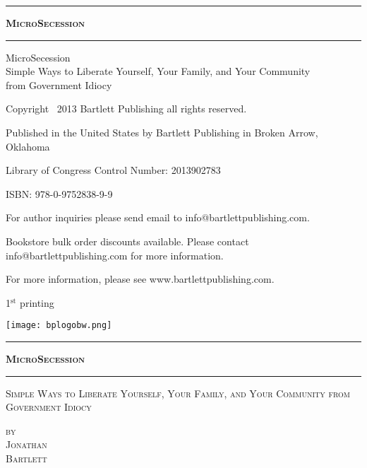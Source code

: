 \begin{titlepage}

\thispagestyle{empty}
\vspace*{\fill}
\begin{center}
\hrule
{\LARGE \textsc{\textbf{MicroSecession}}}
\baselineskip
\hrule
\end{center}
\vspace*{\fill}

\clearpage %

\thispagestyle{empty}
\vspace*{\fill}

{\small
MicroSecession \\ Simple Ways to Liberate Yourself, Your Family, and Your Community \\ from Government Idiocy

Copyright \textcopyright\ 2013 Bartlett Publishing all rights reserved.

Published in the United States by Bartlett Publishing in Broken Arrow, Oklahoma

Library of Congress Control Number: 2013902783

ISBN: 978-0-9752838-9-9

For author inquiries please send email to info@bartlettpublishing.com.  

Bookstore bulk order discounts available.  Please contact info@bartlettpublishing.com for more information.

For more information, please see www.bartlettpublishing.com.

1$^{\textrm{st}}$ printing
}
\baselineskip

\texttt{[image: bplogobw.png]}


\vspace*{\fill}

\clearpage %

\thispagestyle{empty}
\vspace*{\fill}
\begin{center}
\hrule
{\LARGE \textsc{\textbf{MicroSecession}}}
\baselineskip
\hrule
{}\baselineskip
{\Large \textsc{Simple Ways to Liberate Yourself, Your Family, and Your Community from Government Idiocy}}

\baselineskip

{\LARGE 
	{\textsc{ 
		\hfill by \hspace*{1in} \\ 
		\hfill Jonathan \hspace*{1in} \\ 
		\hfill Bartlett \hspace*{1in} \\
	} }
}


\end{center}
\end{titlepage}
